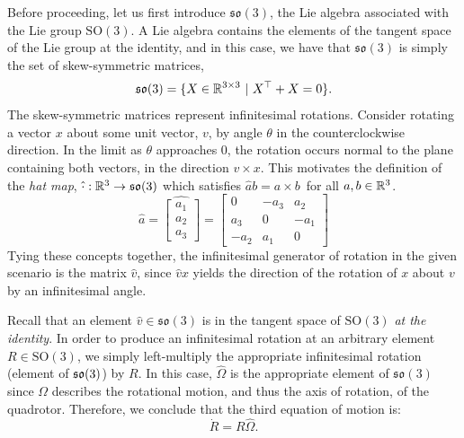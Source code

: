 Before proceeding, let us first introduce $\mathfrak{so}(3)$, the Lie algebra associated with the Lie group $\text{SO}(3)$. A Lie algebra contains the elements of the tangent space of the Lie group at the identity, and in this case, we have that $\mathfrak{so}(3)$ is simply the set of skew-symmetric matrices,
\begin{equation}
    \mathfrak{so}(3) = \{ X \in \R^{3 \times 3} \ \vert \ X^\top + X = 0 \}.
\end{equation} 
The skew-symmetric matrices represent infinitesimal rotations. Consider rotating a vector $x$ about some unit vector, $v$, by angle $\theta$ in the counterclockwise direction. In the limit as $\theta$ approaches $0$, the rotation occurs normal to the plane containing both vectors, in the direction $v \times x$. This motivates the definition of the \emph{hat map}, $\hat \cdot : \mathbb{R}^3 \to \mathfrak{so}(3)$ which satisfies $\hat a b = a \times b$\ for all $a, b \in \mathbb{R}^3$.
\begin{equation}
    \hat a
    =
    \widehat{
    \begin{bmatrix}
        a_1 \\
        a_2 \\
        a_3
    \end{bmatrix}
    }
    =
    \begin{bmatrix}
        0        &  -a_3 & a_2 \\
        a_3 &  0         & -a_1 \\
        -a_2 & a_1  & 0
    \end{bmatrix}
\end{equation}
Tying these concepts together, the infinitesimal generator of rotation in the given scenario is the matrix $\hat v$, since $\hat v x$ yields the direction of the rotation of $x$ about $v$ by an infinitesimal angle.

Recall that an element $\hat v \in \mathfrak{so}(3)$ is in the tangent space of $\text{SO}(3)$ \emph{at the identity}. In order to produce an infinitesimal rotation at an arbitrary element $R \in \text{SO}(3)$, we simply left-multiply the appropriate infinitesimal rotation (element of $\mathfrak{so}(3)$) by $R$. In this case, $\hat \Omega$ is the appropriate element of $\mathfrak{so}(3)$ since $\Omega$ describes the rotational motion, and thus the axis of rotation, of the quadrotor. Therefore, we conclude that the third equation of motion is:
\begin{equation}
    \dot R = R \hat \Omega.\label{quad:dyn:eqn3}
\end{equation}

